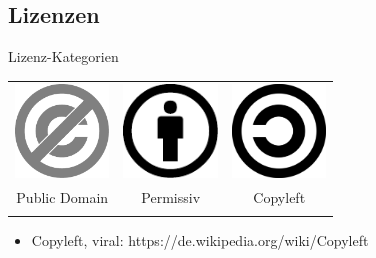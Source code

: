 
\subsection{Lizenzen}
\label{sec:lizenzen}
\subsectionframe

\begin{frame}{Lizenz-Kategorien}
	\begin{center}
		\begin{tabular}{ccc}
		\includegraphics[width=2.5cm]{res/PD-icon.pdf} & \includegraphics[width=2.5cm]{res/by.pdf} & \includegraphics[width=2.5cm]{res/copyleft.pdf} \\ 
		Public Domain & Permissiv & Copyleft \\
		\hspace{3cm} & \hspace{3cm} & \hspace{3cm} \\
		\end{tabular} 
	\end{center}
\end{frame}
\note
{
	\begin{itemize}
		\item Copyleft, viral: https://de.wikipedia.org/wiki/Copyleft
	\end{itemize}
}

